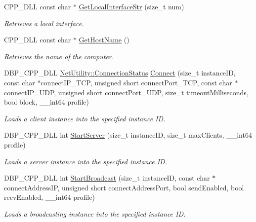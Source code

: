 \begin{DoxyCompactItemize}
CPP\_\-DLL const char $\ast$ \hyperlink{namespacemn_a6344a20d5c370b8956113db7e1b2e6d4}{GetLocalInterfaceStr} (size\_\-t num)
\begin{DoxyCompactList}\small\item\em Retrieves a local interface. \item\end{DoxyCompactList}\item 
CPP\_\-DLL const char $\ast$ \hyperlink{namespacemn_a50d1939a356ab07a100762ef29ab6748}{GetHostName} ()
\begin{DoxyCompactList}\small\item\em Retrieves the name of the computer. \item\end{DoxyCompactList}\item 
DBP\_\-CPP\_\-DLL \hyperlink{class_net_utility_a7eae52138f8bd597ffc67ebf07e86b6d}{NetUtility::ConnectionStatus} \hyperlink{namespacemn_ab9399b132dc43e4b46d578a25f422bc0}{Connect} (size\_\-t instanceID, const char $\ast$connectIP\_\-TCP, unsigned short connectPort\_\-TCP, const char $\ast$connectIP\_\-UDP, unsigned short connectPort\_\-UDP, size\_\-t timeoutMilliseconds, bool block, \_\-\_\-int64 profile)
\begin{DoxyCompactList}\small\item\em Loads a client instance into the specified instance ID. \item\end{DoxyCompactList}\item 
DBP\_\-CPP\_\-DLL int \hyperlink{namespacemn_ac35052139b0152c092a1097d065e0c2f}{StartServer} (size\_\-t instanceID, size\_\-t maxClients, \_\-\_\-int64 profile)
\begin{DoxyCompactList}\small\item\em Loads a server instance into the specified instance ID. \item\end{DoxyCompactList}\item 
DBP\_\-CPP\_\-DLL int \hyperlink{namespacemn_a2b85e7da0cf4c6a1cf5ff67f580b29b5}{StartBroadcast} (size\_\-t instanceID, const char $\ast$connectAddressIP, unsigned short connectAddressPort, bool sendEnabled, bool recvEnabled, \_\-\_\-int64 profile)
\begin{DoxyCompactList}\small\item\em Loads a broadcasting instance into the specified instance ID. \item\end{DoxyCompactList}\item 

\end{DoxyCompactItemize}
